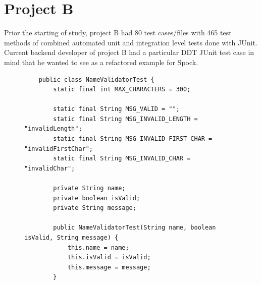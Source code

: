     \section{Project B}
    Prior the starting of study, project B had 80 test cases/files with 465 test methods of combined automated unit and integration level tests done with JUnit.
    Current backend developer of project B had a particular DDT JUnit test case in mind that he wanted to see as a refactored example
    for Spock.

    \begin{figure}[H]
        \begin{lstlisting}[style=javatiny]
    %%@RunWith%%(Parameterized.class)
    public class NameValidatorTest {
        static final int MAX_CHARACTERS = 300;

        static final String MSG_VALID = "";
        static final String MSG_INVALID_LENGTH = "invalidLength";
        static final String MSG_INVALID_FIRST_CHAR = "invalidFirstChar";
        static final String MSG_INVALID_CHAR = "invalidChar";

        private String name;
        private boolean isValid;
        private String message;

        public NameValidatorTest(String name, boolean isValid, String message) {
            this.name = name;
            this.isValid = isValid;
            this.message = message;
        }


\end{lstlisting}
\end{figure}
